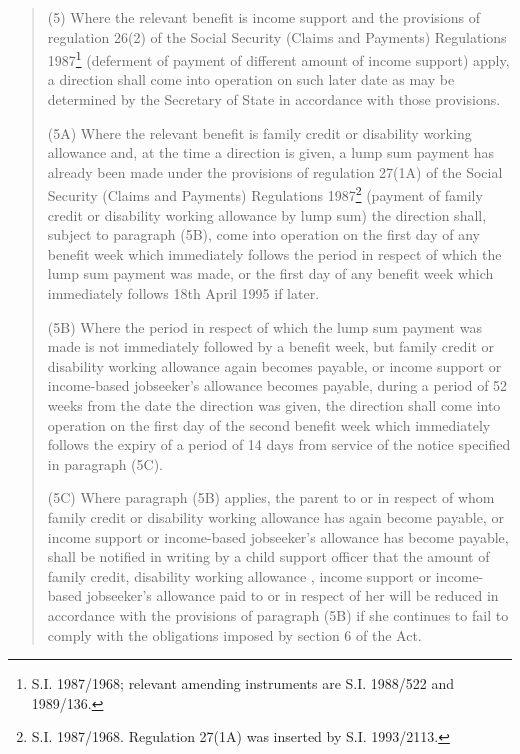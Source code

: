 \documentclass[a4paper,12pt]{article}
\begin{document}
{\begin{quotation}
(5) Where the relevant benefit is income support and the provisions of regulation 26(2) of the Social Security (Claims and Payments) Regulations 1987\footnote{\frenchspacing S.I. 1987/1968; relevant amending instruments are S.I. 1988/522 and 1989/136.} (deferment of payment of different amount of income support) apply, a direction shall come into operation on such later date as may be determined by the Secretary of State in accordance with those provisions.

(5A) Where the relevant benefit is family credit or disability working allowance and, at the time a direction is given, a lump sum payment has already been made under the provisions of regulation 27(1A) of the Social Security (Claims and Payments) Regulations 1987\footnote{\frenchspacing S.I. 1987/1968. Regulation 27(1A) was inserted by S.I. 1993/2113.} (payment of family credit or disability working allowance by lump sum) the direction shall, subject to paragraph (5B), come into operation on the first day of any benefit week which immediately follows the period in respect of which the lump sum payment was made, or the first day of any benefit week which immediately follows 18th April 1995 if later.

(5B) Where the period in respect of which the lump sum payment was made is not immediately followed by a benefit week, but family credit or disability working allowance again becomes payable, or income support 
or income-based jobseeker’s allowance  %
becomes payable, during a period of 52 weeks from the date the direction was given, the direction shall come into operation on the first day of the second benefit week which immediately follows the expiry of a period of 14 days from service of the notice specified in paragraph (5C).

(5C) Where paragraph (5B) applies, the parent to or in respect of whom family credit or disability working allowance has again become payable, or income support 
or income-based jobseeker’s allowance  %
has become payable, shall be notified in writing by a child support officer that the amount of family credit, disability working allowance%
, income support or income-based jobseeker’s allowance  %
paid to or in respect of her will be reduced in accordance with the provisions of paragraph (5B) if she continues to fail to comply with the obligations imposed by section 6 of the Act.


\end{quotation}}
\end{document}
